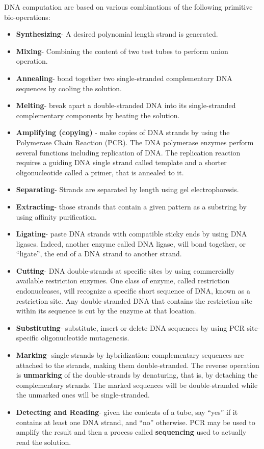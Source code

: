 DNA computation are based on various combinations of the following primitive bio-operations:
  \begin{itemize}
    \item \textbf{Synthesizing}- A desired polynomial length strand is generated.
        \item \textbf{Mixing}- Combining the content of two test tubes to perform union operation.
        \item \textbf{Annealing}- bond  together  two  single-stranded  complementary  DNA sequences  by  cooling  the  solution.
        \item \textbf{Melting}- break apart a double-stranded DNA into its single-stranded complementary  components  by  heating  the  solution.
         \item \textbf{Amplifying (copying) }- make  copies  of  DNA  strands  by  using  the Polymerase  Chain  Reaction  (PCR).  The  DNA  polymerase  enzymes perform several   functions   including replication of DNA. The replication reaction requires a  guiding  DNA  single strand  called template and  a  shorter  oligonucleotide  called  a primer, that  is annealed to it. 
         \item \textbf{Separating}- Strands are separated by length using gel electrophoresis.
         \item \textbf{Extracting}- those strands that contain a given pattern as a substring by using affinity purification.
        \item \textbf{Ligating}- paste  DNA  strands  with  compatible  sticky  ends  by  using DNA  ligases.  Indeed,  another  enzyme  called DNA  ligase,  will  bond together, or ``ligate'', the end of a DNA strand to another strand.
        \item \textbf{Cutting}- DNA double-strands at specific sites by using commercially available   restriction   enzymes. One   class   of   enzyme, called restriction endonucleases, will recognize a specific short sequence of DNA,  known  as  a  restriction  site.  Any  double-stranded  DNA  that contains the restriction site within its sequence is cut by the enzyme at that location. 
        \item \textbf{Substituting}- substitute,  insert  or  delete  DNA  sequences  by  using PCR site-specific oligonucleotide mutagenesis.
        \item \textbf{Marking}- single strands by hybridization: complementary sequences are  attached  to  the  strands,  making  them  double-stranded.  The reverse    operation    is \textbf{unmarking} of    the    double-strands    by denaturing,  that  is,  by  detaching  the  complementary  strands.  The marked sequences will be double-stranded while the unmarked ones will be single-stranded.
        \item \textbf{Detecting and Reading}- given the contents of a tube, say ``yes'' if it contains at least one DNA strand, and ``no'' otherwise. PCR may be used  to  amplify  the  result  and  then  a  process  called \textbf{sequencing} used to actually read the solution. 
  \end{itemize}
    
